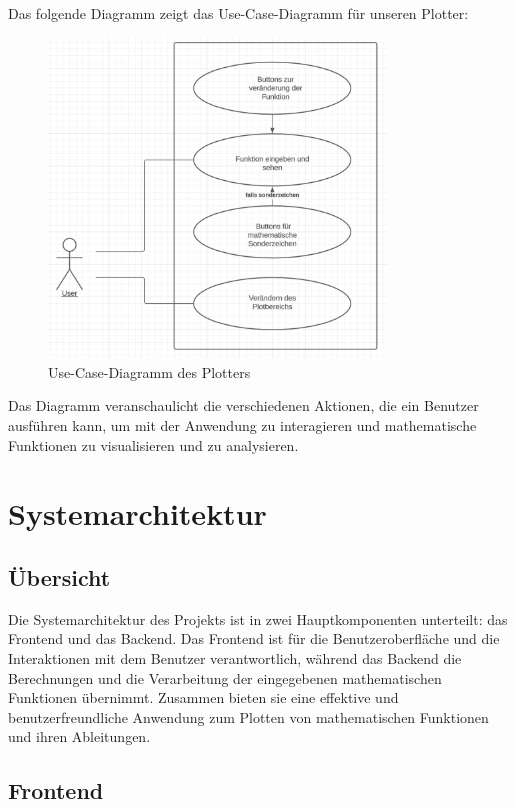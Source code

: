 \documentclass[a4paper]{article}
\begin{document}
Das folgende Diagramm zeigt das Use-Case-Diagramm für unseren Plotter:

\begin{figure}[h]
	\centering
	\includegraphics[width=0.8\textwidth]{Resources/use-case-diagram.png}
	\caption{Use-Case-Diagramm des Plotters}
	\label{fig:use_case_diagram}
\end{figure}

Das Diagramm veranschaulicht die verschiedenen Aktionen, die ein Benutzer ausführen kann, um mit der Anwendung zu interagieren und mathematische Funktionen zu visualisieren und zu analysieren.

\section{Systemarchitektur}

\subsection{Übersicht}

Die Systemarchitektur des Projekts ist in zwei Hauptkomponenten unterteilt: das Frontend und das Backend. Das Frontend ist für die Benutzeroberfläche und die Interaktionen mit dem Benutzer verantwortlich, während das Backend die Berechnungen und die Verarbeitung der eingegebenen mathematischen Funktionen übernimmt. Zusammen bieten sie eine effektive und benutzerfreundliche Anwendung zum Plotten von mathematischen Funktionen und ihren Ableitungen.

\subsection{Frontend}
\end{document}

